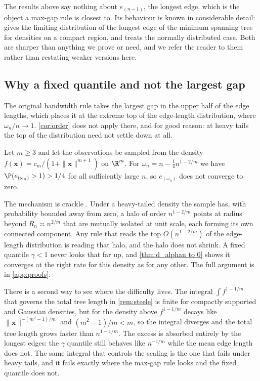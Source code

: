 \begin{remark}\label{rem:penrose}
  The results above say nothing about $e_{(n-1)}$, the longest edge, which is the object a max-gap rule is closest to. Its behaviour is known in considerable detail: \citet{Penrose1997} gives the limiting distribution of the longest edge of the minimum spanning tree for densities on a compact region, and \citet{Penrose1998} treats the normally distributed case. Both are sharper than anything we prove or need, and we refer the reader to them rather than restating weaker versions here.
\end{remark}

\subsection{Why a fixed quantile and not the largest gap}\label{sec:counterexample}

The original bandwidth rule takes the largest gap in the upper half of the edge lengths, which places it at the extreme top of the edge-length distribution, where $\omega_n/n\to1$. \cref{cor:order} does not apply there, and for good reason: at heavy tails the top of the distribution need not settle down at all.

\begin{counterexample}\label{cex:fattails}
  Let $m\geq3$ and let the observations be sampled from the density $f(\bm{x})=c_m/(1+\|\bm{x}\|^{m+1})$ on $\R^m$. For $\omega_n=n-\tfrac{1}{4}n^{1-2/m}$ we have $\P(e_{(\omega_n)}>1)>1/4$ for all sufficiently large $n$, so $e_{(\omega_n)}$ does not converge to zero.
\end{counterexample}

The mechanism is crackle \citep{Crackle}. Under a heavy-tailed density the sample has, with probability bounded away from zero, a halo of order $n^{1-2/m}$ points at radius beyond $R_n \asymp n^{2/m}$ that are mutually isolated at unit scale, each forming its own connected component. Any rule that reads the top $O(n^{1-2/m})$ of the edge-length distribution is reading that halo, and the halo does not shrink. A fixed quantile $\gamma<1$ never looks that far up, and \cref{thm:d_alphan to 0} shows it converges at the right rate for this density as for any other. The full argument is in \cref{app:proofs}.

There is a second way to see where the difficulty lives. The integral $\int f^{1-1/m}$ that governs the total tree length in \cref{rem:steele} is finite for compactly supported and Gaussian densities, but for the density above $f^{1-1/m}$ decays like $\|\bm{x}\|^{-(m^2-1)/m}$ and $(m^2-1)/m<m$, so the integral diverges and the total tree length grows faster than $n^{1-1/m}$. The excess is absorbed entirely by the longest edges: the $\gamma$ quantile still behaves like $n^{-1/m}$ while the mean edge length does not. The same integral that controls the scaling is the one that fails under heavy tails, and it fails exactly where the max-gap rule looks and the fixed quantile does not.


